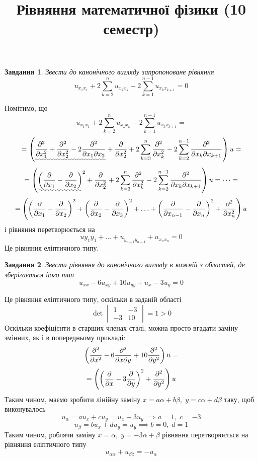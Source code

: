 \documentclass[12pt]{article} %
\title{Рівняння математичної фізики (10 семестр)}
\author{}
\newtheorem{prob}{Завдання}
\newcommand{\dt}{\;dt}
\newcommand{\dx}{\;dx}
\begin{document}
\def\dx{\Delta x}
\def\dt{\Delta t}
\def\dX{\frac{\partial}{\partial x}}
\maketitle
\begin{prob}Звести до канонічного вигляду запропоноване рівняння
	\[u_{x_1x_1}+2\sum_{k=2}^nu_{x_kx_k}-2\sum_{k=1}^{n-1}u_{x_kx_{k+1}}=0\]
\end{prob}
Помітимо, що
\[u_{x_1x_1}+2\sum_{k=2}^nu_{x_kx_k}-2\sum_{k=1}^{n-1}u_{x_kx_{k+1}}=\]\[=\mybra{\uwave{
\frac{\partial^2}{\partial x_1^2}+\frac{\partial^2}{\partial x_2^2}-
2\frac{\partial^2}{\partial x_1\partial x_2}}+\frac{\partial}{\partial x_2^2}
+2\sum_{k=3}^n\frac{\partial^2}{\partial x_k^2}-2\sum_{k=2}^{n-1}\frac{\partial^2}{\partial x_k\partial x_{k+1}}}u=\]
\[=\mybra{\uwave{\mybra{\frac{\partial}{\partial x_1}-\frac{\partial}{\partial x_2}}}^2+\frac{\partial}{\partial x_2^2}
+2\sum_{k=3}^n\frac{\partial^2}{\partial x_k^2}-2\sum_{k=2}^{n-1}\frac{\partial^2}{\partial x_k\partial x_{k+1}}}u=\dots=\]
\[=\left(\left(\frac{\partial}{\partial x_1}-\frac{\partial}{\partial x_2}\right)^2+
\left(\frac{\partial}{\partial x_2}-\frac{\partial}{\partial x_3}\right)^2+\hdots+
\left(\frac{\partial}{\partial x_{n-1}}-\frac{\partial}{\partial x_n}\right)^2+\frac{\partial^2}{\partial x_n^2}
\right)u\]
і рівняння перетворюється на
\[u{y_1y_1}+\hdots+u_{y_{n-1}y_{n-1}}+u_{x_nx_n}=0\]
Це рівняння еліптичного типу.
\begin{prob}Звести рівняння до канонічного вигляду в кожній з областей, де зберігається його тип
	\[u_{xx}-6u_{xy}+10u_{yy}+u_x-3u_y=0\]
\end{prob}
Це рівняння еліптичного типу, оскільки в заданій області 
\[\det\begin{vmatrix}1&-3\\-3&10\end{vmatrix}=1>0\]
Оскільки коефіцієнти в старших членах сталі, можна просто вгадати заміну змінних, як і в попередньому прикладі:
\[\left(\frac{\partial^2}{\partial x^2}-6\frac{\partial^2}{\partial x\partial y}+10\frac{\partial^2}{\partial y^2}\right)u=\]
\[=\left(\left(\frac{\partial}{\partial x}-3\frac{\partial}{\partial y}\right)^2+\frac{\partial^2}{\partial y^2}\right)u\]
Таким чином, маємо зробити лінійну заміну $x=a\alpha+b\beta,\;y=c\alpha+d\beta$ таку, щоб виконувалось
\[u_\alpha=au_x+cu_y=u_x-3u_y\implies a=1,\;c=-3\]
\[u_\beta=bu_x+du_y=u_y\implies b=0,\;d=1\]
Таким чином, роблячи заміну $x=\alpha,\;y=-3\alpha+\beta$ рівняння перетворюється на рівняння еліптичного типу
\[u_{\alpha\alpha}+u_{\beta\beta}=-u_\alpha\]
\end{document}

